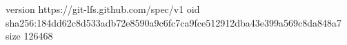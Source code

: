 version https://git-lfs.github.com/spec/v1
oid sha256:184dd62c8d533adb72e8590a9c6fc7ca9fce512912dba43e399a569c8da848a7
size 126468
